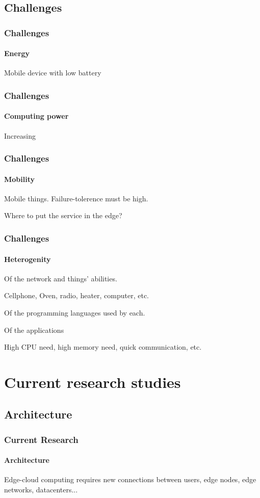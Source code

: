 \documentclass[utf8,xcolor=table, page number]{earlywinter}
\begin{document}
\subsection{Challenges}


\begin{frame}
  \frametitle{Challenges}
  \framesubtitle{Energy}
  
  Mobile device with low battery
  
\end{frame}
\begin{frame}
  \frametitle{Challenges}
  \framesubtitle{Computing power}
  
  Increasing
  
\end{frame}
\begin{frame}
  \frametitle{Challenges}
  \framesubtitle{Mobility}
  
  Mobile things. Failure-tolerence must be high.
  
  Where to put the service in the edge?
  
\end{frame}
\begin{frame}
  \frametitle{Challenges}
  \framesubtitle{Heterogenity}
  
  Of the network and things' abilities.
  
	\begin{example}
		Cellphone, Oven, radio, heater, computer, etc.
	\end{example}
  
  Of the programming languages used by each.  
  
  Of the applications
	\begin{example}
		High CPU need, high memory need, quick communication, etc.
	\end{example}
  
\end{frame}

\section{Current research studies}
\subsection{Architecture}
\begin{frame}
  \frametitle{Current Research}
  \framesubtitle{Architecture}

  Edge-cloud computing requires new connections between users, edge nodes, edge networks, datacenters...

  

\end{frame}
\end{document}
